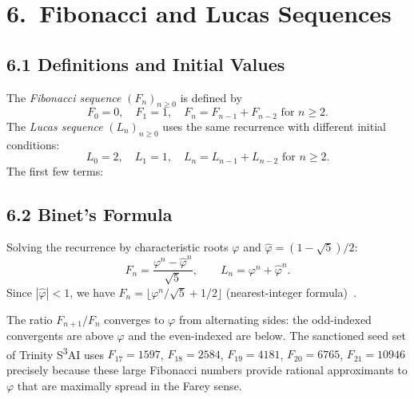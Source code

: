 \section{6.\ Fibonacci and Lucas Sequences}
\label{sec:gc-fibonacci-lucas}

\subsection{6.1 Definitions and Initial Values}
\label{subsec:gc-fib-def}

The \emph{Fibonacci sequence} $(F_n)_{n \geq 0}$ is
defined by
\[
  F_0 = 0,\quad F_1 = 1,\quad F_n = F_{n-1} + F_{n-2}
  \text{ for } n \geq 2.
\]
The \emph{Lucas sequence} $(L_n)_{n \geq 0}$ uses
the same recurrence with different initial conditions:
\[
  L_0 = 2,\quad L_1 = 1,\quad L_n = L_{n-1} + L_{n-2}
  \text{ for } n \geq 2.
\]
The first few terms:
\begin{center}
\end{center}

\subsection{6.2 Binet's Formula}
\label{subsec:gc-binet}

Solving the recurrence by characteristic roots
$\varphi$ and $\hat\varphi = (1-\sqrt{5})/2$:
\[
  F_n = \frac{\varphi^n - \hat\varphi^n}{\sqrt{5}},
  \qquad
  L_n = \varphi^n + \hat\varphi^n.
\]
Since $|\hat\varphi| < 1$, we have
$F_n = \lfloor \varphi^n/\sqrt{5} + 1/2 \rfloor$
(nearest-integer formula)~\cite{koshy_fib_lucas}.

The ratio $F_{n+1}/F_n$ converges to $\varphi$ from
alternating sides: the odd-indexed convergents are
above $\varphi$ and the even-indexed are below.
The sanctioned seed set of Trinity S\textsuperscript{3}AI
uses $F_{17}=1597$, $F_{18}=2584$, $F_{19}=4181$,
$F_{20}=6765$, $F_{21}=10946$ precisely because these
large Fibonacci numbers provide rational approximants
to $\varphi$ that are maximally spread in the
Farey sense.

